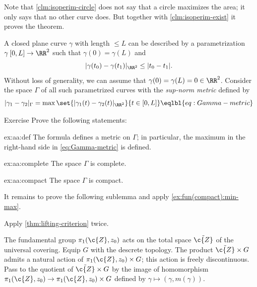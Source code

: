 Note that \ref{clm:isoperim-circle} does not say that a circle maximizes the area; it only says that no other curve does.
But together with \ref{clm:isoperim-exist} it proves the theorem.

A closed plane curve $\gamma$ with length $\le L$ can be described by a parametrization $\gamma\:[0,L]\to\RR^2$ such that $\gamma(0)=\gamma(L)$ and
\[|\gamma(t_0)-\gamma(t_1)|_{\RR^2}\le |t_0-t_1|.\]
Without loss of generality, we can assume that $\gamma(0)=\gamma(L)=0\in\RR^2$.
Consider the space $\Gamma$ of all such parametrized curves with the \emph{sup-norm metric} defined by
\[|\gamma_1-\gamma_2|_\Gamma= \max\set{|\gamma_1(t)-\gamma_2(t)|_{\RR^2}}{t\in[0,L]}
\eqlbl{eq:Gamma-metric}\]

\begin{thm}{Exercise}\label{ex:aa}
Prove the following statements:
\begin{subthm}{ex:aa:def}
The formula defines a metric on $\Gamma$; in particular, the maximum in the right-hand side in \ref{eq:Gamma-metric} is defined.
\end{subthm}

\begin{subthm}{ex:aa:complete}
The space $\Gamma$ is complete.
\end{subthm}

\begin{subthm}{ex:aa:compact}
The space $\Gamma$ is compact.
\end{subthm}

\end{thm}

It remains to prove the following sublemma and apply \ref{ex:fun(compact):min-max}.
\qeds















 Apply \ref{thm:lifting-criterion} twice.

The fundamental group $\pi_1(\c{Z},z_0)$ acts on the total space $\tilde{\c{Z}}$ of the universal covering.
Equip $G$ with the descrete topology.
The product $\tilde{\c{Z}}\times G$ admits a natural action of $\pi_1(\c{Z},z_0)\times G$;
this action is freely discontinuous.
Pass to the quotient of $\tilde{\c{Z}}\times G$ by the image of homomorphism $\pi_1(\c{Z},z_0)\to\pi_1(\c{Z},z_0)\times G$ defined by $\gamma\mapsto (\gamma,m(\gamma))$.

